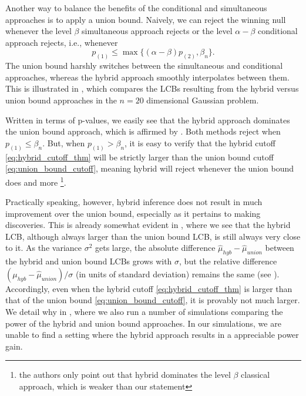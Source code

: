 \documentclass{article}
\begin{document}
Another way to balance the benefits of the conditional and simultaneous approaches is to apply a union bound. Naively, we can reject the winning null whenever the level $\beta$ simultaneous approach rejects or the level $\alpha -\beta$ conditional approach rejects, i.e., whenever
\begin{equation}
    \label{eq:union_bound_cutoff}
    p_{(1)} \leq \max\{(\alpha - \beta) p_{(2)}, \beta_n\}.
\end{equation}
The union bound harshly switches between the simultaneous and conditional approaches, whereas the hybrid approach smoothly interpolates between them. This is illustrated in , which compares the LCBs resulting from the hybrid versus union bound approaches in the $n=20$ dimensional Gaussian problem. 

Written in terms of p-values, we easily see that the hybrid approach dominates the union bound approach, which is affirmed by . Both methods reject when $p_{(1)} \leq \beta_n$. But, when $p_{(1)} > \beta_n$, it is easy to verify that the hybrid cutoff \eqref{eq:hybrid_cutoff_thm} will be strictly larger than the union bound cutoff \eqref{eq:union_bound_cutoff}, meaning hybrid will reject whenever the union bound does and more \footnote{the authors \cite{Andrews2023} only point out that hybrid dominates the level $\beta$ classical approach, which is weaker than our statement}. 

Practically speaking, however, hybrid inference does not result in much improvement over the union bound, especially as it pertains to making discoveries. This is already somewhat evident in , where we see that the hybrid LCB, although always larger than the union bound LCB, is still always very close to it. As the variance $\sigma^2$ gets large, the absolute difference $\hat{\mu}_{hyb} - \hat{\mu}_{union} $ between the hybrid and union bound LCBs grows with $\sigma$, but the relative difference $({\mu}_{hyb} - \hat{\mu}_{union})/\sigma$   (in units of standard deviation) remains the same (see ). Accordingly, even when the hybrid cutoff \eqref{eq:hybrid_cutoff_thm} is larger than that of the union bound \eqref{eq:union_bound_cutoff}, it is provably not much larger. We detail why in , where we also run a number of simulations comparing the power of the hybrid and union bound approaches. In our simulations, we are unable to find a setting where the hybrid approach results in a appreciable power gain.  
\end{document}
